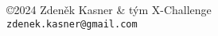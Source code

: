 \documentclass{article}
\begin{document}
\begin{center}
  \vfill








  \copyright 2024 Zdeněk Kasner \& tým X-Challenge \\ \vspace*{0.1cm}
  \texttt{zdenek.kasner@gmail.com} \\ \vspace*{0.5cm}
  \byncsa
\end{center}

\end{document}
